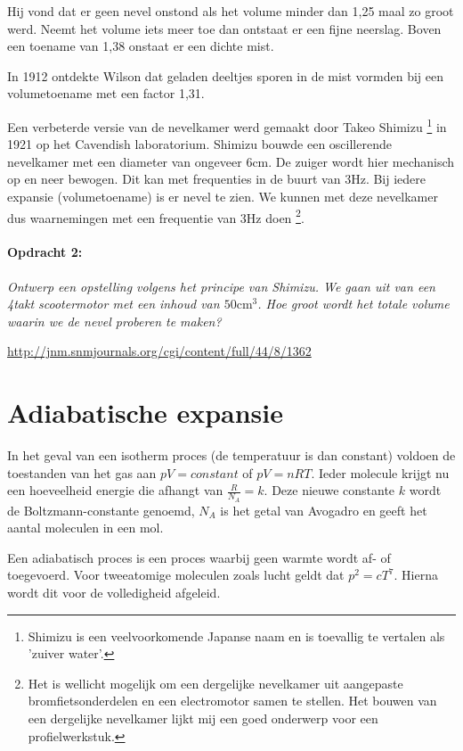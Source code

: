 Hij vond dat er geen nevel onstond als het volume minder dan 1,25
maal zo groot werd. Neemt het volume iets meer toe dan ontstaat er
een fijne neerslag. Boven een toename van 1,38 onstaat er een dichte
mist.

In 1912 ontdekte Wilson dat geladen deeltjes sporen in de mist vormden
bij een volumetoename met een factor 1,31.

Een verbeterde versie van de nevelkamer werd gemaakt door Takeo Shimizu
\footnote{Shimizu is een veelvoorkomende Japanse naam en is toevallig te
vertalen als 'zuiver water'.} in 1921 op het Cavendish laboratorium.
Shimizu bouwde een oscillerende nevelkamer met een diameter van ongeveer
6cm. De zuiger wordt hier mechanisch op en neer bewogen. Dit kan met
frequenties in de buurt van 3Hz. Bij iedere expansie (volumetoename) is
er nevel te zien. We kunnen met deze nevelkamer dus waarnemingen met een
frequentie van 3Hz doen \footnote{Het is wellicht mogelijk om een
dergelijke nevelkamer uit aangepaste bromfietsonderdelen en een
electromotor samen te stellen. Het bouwen van een dergelijke nevelkamer
lijkt mij een goed onderwerp voor een profielwerkstuk.}.


\paragraph*{Opdracht 2:}

\emph{Ontwerp een opstelling volgens het principe van Shimizu. We
gaan uit van een 4takt scootermotor met een inhoud van $50\mathrm{cm^{3}}$.
Hoe groot wordt het totale volume waarin we de nevel proberen te maken? }

\url{http://jnm.snmjournals.org/cgi/content/full/44/8/1362}


\section{Adiabatische expansie}

In het geval van een isotherm proces (de temperatuur is dan constant)
voldoen de toestanden van het gas aan $pV=constant$ of $pV=nRT$.
Ieder molecule krijgt nu een hoeveelheid energie die afhangt van $\frac{R}{N_{A}}=k$.
Deze nieuwe constante $k$ wordt de Boltzmann-constante genoemd, $N_{A}$
is het getal van Avogadro en geeft het aantal moleculen in een mol.

Een adiabatisch proces is een proces waarbij geen warmte wordt af-
of toegevoerd. Voor tweeatomige moleculen zoals lucht geldt dat $p^{2}=cT^{7}$.
Hierna wordt dit voor de volledigheid afgeleid. 

